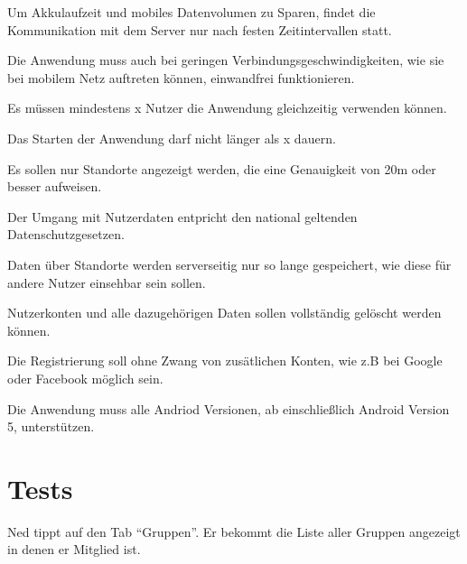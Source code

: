 \documentclass[parskip=full,11pt]{scrartcl}
\begin{document}
Um Akkulaufzeit und mobiles Datenvolumen zu Sparen, findet die Kommunikation mit dem Server nur nach festen Zeitintervallen statt.

Die Anwendung muss auch bei geringen Verbindungsgeschwindigkeiten, wie sie bei mobilem Netz auftreten können, einwandfrei funktionieren.

Es müssen mindestens x Nutzer die Anwendung gleichzeitig verwenden können.  %

Das Starten der Anwendung darf nicht länger als x dauern.   %

Es sollen nur Standorte angezeigt werden, die eine Genauigkeit von 20m oder besser aufweisen.

Der Umgang mit Nutzerdaten entpricht den national geltenden Datenschutzgesetzen.

Daten über Standorte werden serverseitig nur so lange gespeichert, wie diese für andere Nutzer einsehbar sein sollen.

Nutzerkonten und alle dazugehörigen Daten sollen vollständig gelöscht werden können.

Die Registrierung soll ohne Zwang von zusätlichen Konten, wie z.B bei Google oder Facebook möglich sein.

Die Anwendung muss alle Andriod Versionen, ab einschließlich Android Version 5, unterstützen.



\section{Tests}


{Ned tippt auf den Tab  \enquote{Gruppen}.}
{Er bekommt die Liste aller Gruppen angezeigt in denen er Mitglied ist.}
\end{document}
